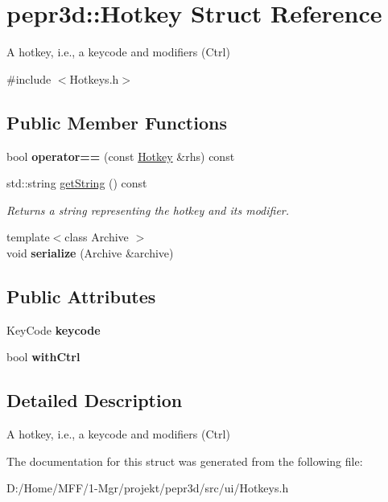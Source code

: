 \hypertarget{structpepr3d_1_1_hotkey}{}\section{pepr3d\+::Hotkey Struct Reference}
\label{structpepr3d_1_1_hotkey}


A hotkey, i.\+e., a keycode and modifiers (Ctrl)  




{\ttfamily \#include $<$Hotkeys.\+h$>$}

\subsection*{Public Member Functions}
\begin{DoxyCompactItemize}
\item 
\mbox{\label{structpepr3d_1_1_hotkey_aa8b6805656f8ae9ac5782f7b71c42592}} 
bool {\bfseries operator==} (const \mbox{\hyperlink{structpepr3d_1_1_hotkey}{Hotkey}} \&rhs) const
\item 
\mbox{\label{structpepr3d_1_1_hotkey_a6a860b86dc3245d9b55f1c14773d828a}} 
std\+::string \mbox{\hyperlink{structpepr3d_1_1_hotkey_a6a860b86dc3245d9b55f1c14773d828a}{get\+String}} () const
\begin{DoxyCompactList}\small\item\em Returns a string representing the hotkey and its modifier. \end{DoxyCompactList}\item 
\mbox{\label{structpepr3d_1_1_hotkey_abcadab8376d18a77e5bb7459274741e9}} 
{\footnotesize template$<$class Archive $>$ }\\void {\bfseries serialize} (Archive \&archive)
\end{DoxyCompactItemize}
\subsection*{Public Attributes}
\begin{DoxyCompactItemize}
\item 
\mbox{\label{structpepr3d_1_1_hotkey_a2345b58eac22b51f0dacb29f38e2e68a}} 
Key\+Code {\bfseries keycode}
\item 
\mbox{\label{structpepr3d_1_1_hotkey_ae05f8b76c074b47b0c1ccd79bf105760}} 
bool {\bfseries with\+Ctrl}
\end{DoxyCompactItemize}


\subsection{Detailed Description}
A hotkey, i.\+e., a keycode and modifiers (Ctrl) 

The documentation for this struct was generated from the following file\+:\begin{DoxyCompactItemize}
\item 
D\+:/\+Home/\+M\+F\+F/1-\/\+Mgr/projekt/pepr3d/src/ui/Hotkeys.\+h\end{DoxyCompactItemize}
